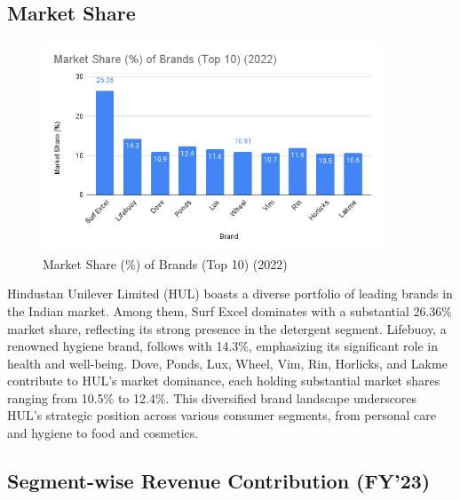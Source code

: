 \subsection{Market Share}
\begin{figure}[h]
    \centering
    \includegraphics[width=0.9\textwidth]{images/Market Share.png}
    \centering
    \caption{Market Share (\%) of Brands (Top 10) (2022)}
    \label{fig:Market Share}
  \end{figure}
Hindustan Unilever Limited (HUL) boasts a diverse portfolio of leading brands in the Indian market. Among them, Surf Excel dominates with a substantial 26.36\% market share, reflecting its strong presence in the detergent segment. Lifebuoy, a renowned hygiene brand, follows with 14.3\%, emphasizing its significant role in health and well-being. Dove, Ponds, Lux, Wheel, Vim, Rin, Horlicks, and Lakme contribute to HUL's market dominance, each holding substantial market shares ranging from 10.5\% to 12.4\%. This diversified brand landscape underscores HUL's strategic position across various consumer segments, from personal care and hygiene to food and cosmetics.

\subsection{Segment-wise Revenue Contribution (FY'23)}

